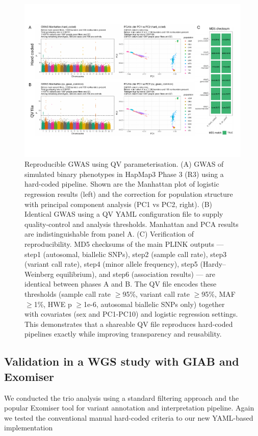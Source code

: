 \begin{figure}[!h]
\centering
\includegraphics[width=\textwidth]{./images/hapmap_gwas_validation.pdf}
    \caption{
Reproducible GWAS using QV parameterisation.
(A) GWAS of simulated binary phenotypes in HapMap3 Phase 3 (R3) using a hard-coded pipeline. Shown are the Manhattan plot of logistic regression results (left) and the correction for population structure with principal component analysis (PC1 vs PC2, right).
(B) Identical GWAS using a QV YAML configuration file to supply quality-control and analysis thresholds. Manhattan and PCA results are indistinguishable from panel A.
(C) Verification of reproducibility. MD5 checksums of the main PLINK outputs — step1 (autosomal, biallelic SNPs), step2 (sample call rate), step3 (variant call rate), step4 (minor allele frequency), step5 (Hardy–Weinberg equilibrium), and step6 (association results) — are identical between phases A and B. The QV file encodes these thresholds (sample call rate $\geq$95\%, variant call rate $\geq$95\%, MAF $\geq$1\%, HWE p $\geq$1e-6, autosomal biallelic SNPs only) together with covariates (sex and PC1-PC10) and logistic regression settings. This demonstrates that a shareable QV file reproduces hard-coded pipelines exactly while improving transparency and reusability.}
    \label{fig:hapmap_gwas_validation}
\end{figure}

\subsection{Validation in a WGS study with GIAB and Exomiser}

We conducted the trio analysis using a standard filtering approach and the popular Exomiser tool for variant annotation and interpretation pipeline. Again we tested the conventional manual hard-coded criteria to our new YAML-based implementation

